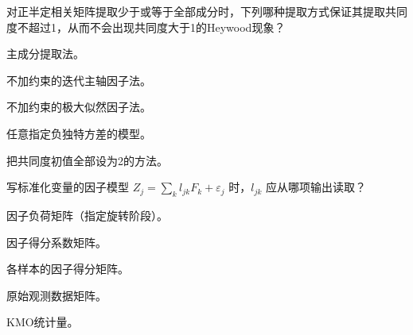 \par\addvspace{6pt}\noindent\begin{minipage}{\linewidth}


对正半定相关矩阵提取少于或等于全部成分时，下列哪种提取方式保证其提取共同度不超过1，从而不会出现共同度大于1的Heywood现象？


\begin{choices}

\item 主成分提取法。

\item 不加约束的迭代主轴因子法。

\item 不加约束的极大似然因子法。

\item 任意指定负独特方差的模型。

\item 把共同度初值全部设为2的方法。

\end{choices}

\end{minipage}\par\vspace{4pt}

\par\addvspace{6pt}\noindent\begin{minipage}{\linewidth}


写标准化变量的因子模型 \(Z_j=\sum_k l_{jk}F_k+\varepsilon_j\) 时，\(l_{jk}\) 应从哪项输出读取？


\begin{choices}

\item 因子负荷矩阵（指定旋转阶段）。

\item 因子得分系数矩阵。

\item 各样本的因子得分矩阵。

\item 原始观测数据矩阵。

\item KMO统计量。

\end{choices}

\end{minipage}\par\vspace{4pt}

